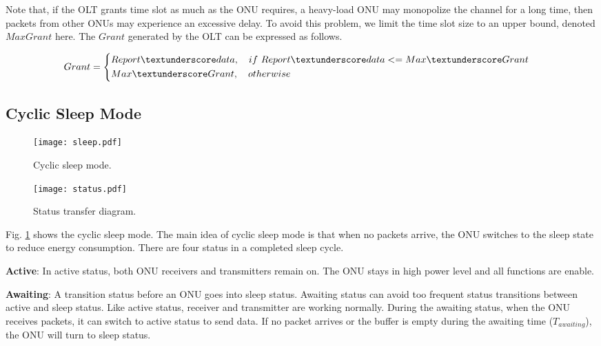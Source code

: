 \documentclass[journal]{IEEEtran}
\begin{document}
Note that, if the OLT grants time slot as much as the ONU requires, a heavy-load ONU may monopolize the channel for a long time, then packets from other ONUs may experience an excessive delay. To avoid this problem, we limit the time slot size to an upper bound, denoted $Max$\textunderscore $Grant$ here. The $Grant$ generated by the OLT can be expressed as follows.

\begin{footnotesize}
\begin{equation}
Grant  =  
\left\{
\begin{aligned}
& Report\textunderscore data, \quad if \ Report\textunderscore data <= Max\textunderscore Grant & \\
& Max\textunderscore Grant, \quad otherwise & \\
\end{aligned}
\right.
\end{equation}
\end{footnotesize}

\subsection{Cyclic Sleep Mode}

\begin{figure}[t]
    \centering 
        \texttt{[image: sleep.pdf]}\\ 
    \caption{ Cyclic sleep mode.}
    \label{sleep}
\end{figure}

\begin{figure}[t]
    \centering 
        \texttt{[image: status.pdf]}\\ 
    \caption{ Status transfer diagram.}
    \label{status}
\end{figure}

Fig. \ref{sleep} shows the cyclic sleep mode. The main idea of cyclic sleep mode is that when no packets arrive, the ONU switches to the sleep state to reduce energy consumption. There are four status in a completed sleep cycle.

\textbf{Active}: In active status, both ONU receivers and transmitters remain on. The ONU stays in high power level and all functions are enable.

\textbf{Awaiting}: A transition status before an ONU goes into sleep status. Awaiting status can avoid too frequent status transitions between active and sleep status. Like active status, receiver and transmitter are working normally. During the awaiting status, when the ONU receives packets, it can switch to active status to send data. If no packet arrives or the buffer is empty during the awaiting time ($T_{awaiting}$), the ONU will turn to sleep status.
\end{document}
